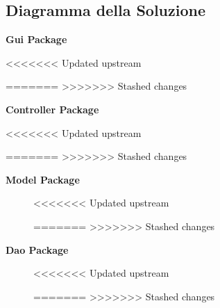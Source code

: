 \newpage
\subsection{Diagramma della Soluzione}

\begin{figure}[h]
	
\end{figure}

\newpage

\begin{center}
	\textbf{Gui Package}
\end{center}

<<<<<<< Updated upstream
\begin{figure}[h]
	
\end{figure}
=======
%	
>>>>>>> Stashed changes

\newpage

\begin{center}
	\textbf{Controller Package}
\end{center}

<<<<<<< Updated upstream
\begin{figure}[h]
	
\end{figure}
=======
%	
>>>>>>> Stashed changes

\newpage

\begin{center}
	\textbf{Model Package}
\end{center}

\begin{figure}[h]
<<<<<<< Updated upstream
	
=======
%	
>>>>>>> Stashed changes
\end{figure}

\newpage

\begin{center}
	\textbf{Dao Package}
\end{center}

\begin{figure}[h]
<<<<<<< Updated upstream
	
=======
%	
>>>>>>> Stashed changes
\end{figure}

